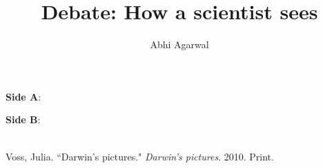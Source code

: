 \documentclass[11pt, oneside]{article}
\title{Debate: How a scientist sees\vspace{-0.4cm}}
\author{Abhi Agarwal\vspace{-1cm}}
\date{}
\begin{document}
\maketitle

\noindent \textbf{Side A}: 

\newpage

\noindent \textbf{Side B}: 


\begin{workscited}
\bibent \\
\bibent Voss, Julia. ``Darwin's pictures."  \textit{Darwin's pictures}.  2010. Print. \\
\end{workscited}
\end{document}
